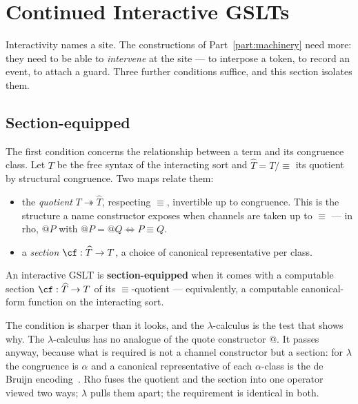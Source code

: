 \chapter{Continued Interactive GSLTs}
\label{ch:cigslt}

Interactivity names a site. The constructions of Part~\ref{part:machinery} need more: they need to be
able to \emph{intervene} at the site --- to interpose a token, to record an event, to
attach a guard. Three further conditions suffice, and this section isolates them.

\section{Section-equipped}

The first condition concerns the relationship between a term and its congruence class.
Let $T$ be the free syntax of the interacting sort and $\widehat{T} = T/{\equiv}$ its
quotient by structural congruence. Two maps relate them:

\begin{itemize}[leftmargin=2em]
  \item the \emph{quotient} $T \twoheadrightarrow \widehat{T}$, respecting $\equiv$,
    invertible up to congruence. This is the structure a name constructor exposes when
    channels are taken up to $\equiv$ --- in rho, $@P$ with $@P = @Q \iff P \equiv Q$.
  \item a \emph{section} $\cf : \widehat{T} \to T$, a choice of canonical representative
    per class.
\end{itemize}

\begin{definition}
\label{ob:def:section}
An interactive GSLT is \textbf{section-equipped} when it comes with a computable section
$\cf : \widehat{T} \to T$ of its $\equiv$-quotient --- equivalently, a computable
canonical-form function on the interacting sort.
\end{definition}

The condition is sharper than it looks, and the $\lambda$-calculus is the test that
shows why. The $\lambda$-calculus has no analogue of the quote constructor $@$. It
passes anyway, because what is required is not a channel constructor but a section: for
$\lambda$ the congruence is $\alpha$ and a canonical representative of each
$\alpha$-class is the de Bruijn encoding~\cite{deBruijn1972}. Rho fuses the quotient and
the section into one operator viewed two ways; $\lambda$ pulls them apart; the
requirement is identical in both.

